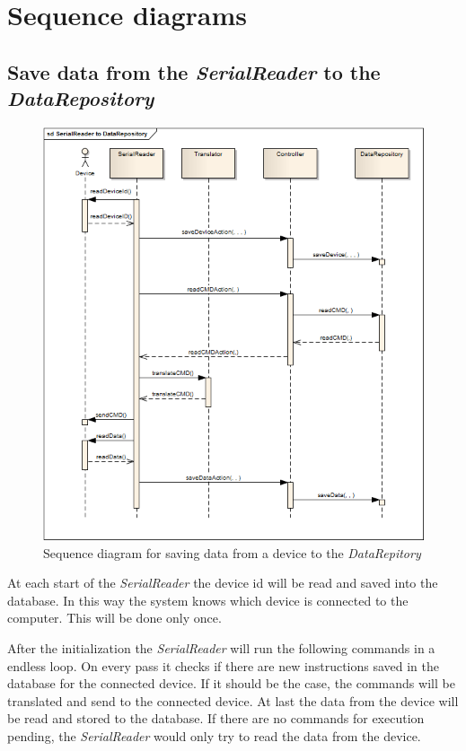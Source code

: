 \newpage
\section{Sequence diagrams}
\subsection{Save data from the \textit{SerialReader} to the \textit{DataRepository}}
\begin{figure}[H]
	\centering
	\includegraphics[width=1.0\textwidth]{pic/SerialReader-to-DataRepository.png}%
    \caption{Sequence diagram for saving data from a device to the \textit{DataRepitory}}
    \label{SerialReadertoDataRepositorypic}%
\end{figure}

At each start of the \textit{SerialReader} the device id will be read and saved into the database. In this way the system knows which device is connected to the computer. This will be done only once.

After the initialization the \textit{SerialReader} will run the following commands in a endless loop. On every pass it checks if there are new instructions saved in the database for the connected device. If it should be the case, the commands will be translated and send to the connected device. At last the data from the device will be read and stored to the database. If there are no commands for execution pending, the \textit{SerialReader} would only try to read the data from the device.

